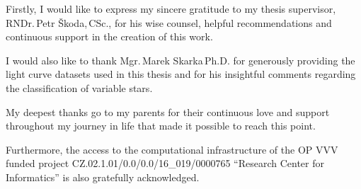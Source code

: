 \documentclass[english,bachelor,twoside]{ctufit-thesis}
\begin{document}
    \frontmatter\frontmatterinit %

    \thispagestyle{empty}\maketitle\thispagestyle{empty}\cleardoublepage %


    \imprintpage %
    \stopTOCentries

    \begin{acknowledgmentpage}

        Firstly, I would like to express my sincere gratitude to my thesis supervisor, RNDr.\,Petr Škoda,\,CSc., for his wise counsel, helpful recommendations and continuous support in the creation of this work.

        I would also like to thank Mgr.\,Marek Skarka\,Ph.D. for generously providing the light curve datasets used in this thesis and for his insightful comments regarding the classification of variable stars.

        My deepest thanks go to my parents for their continuous love and support throughout my journey in life that made it possible to reach this point.

        Furthermore, the access to the computational infrastructure of the OP VVV funded project CZ.02.1.01/0.0/0.0/16\_019/0000765 ``Research Center for Informatics'' is also gratefully acknowledged.
    \end{acknowledgmentpage}
\end{document}
